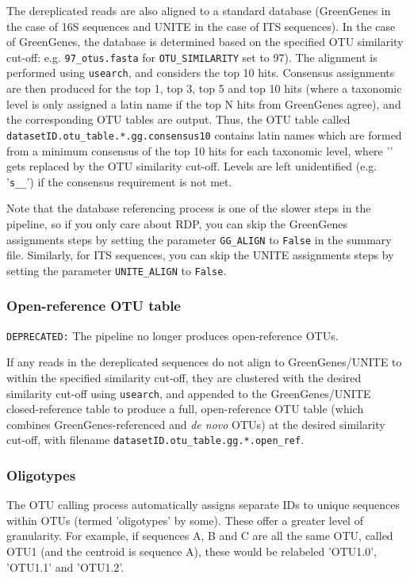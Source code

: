 \documentclass[11pt, oneside]{article}   	%
\begin{document}
The dereplicated reads are also aligned to a standard database (GreenGenes in the case of 16S sequences and UNITE in the case of ITS sequences).  In the case of GreenGenes, the database is determined based on the specified OTU similarity cut-off: e.g. {\tt 97\_otus.fasta} for {\tt OTU\_SIMILARITY} set to 97).  The alignment is performed using {\tt usearch}, and considers the top 10 hits.  Consensus assignments are then produced for the top 1, top 3, top 5 and top 10 hits (where a taxonomic level is only assigned a latin name if the top N hits from GreenGenes agree), and the corresponding OTU tables are output.  Thus, the OTU table called {\tt datasetID.otu\_table.*.gg.consensus10} contains latin names which are formed from a minimum consensus of the top 10 hits for each taxonomic level, where '{\tt *}' gets replaced by the OTU similarity cut-off.  Levels are left unidentified (e.g. '{\tt s\_\_}') if the consensus requirement is not met.  

Note that the database referencing process is one of the slower steps in the pipeline, so if you only care about RDP, you can skip the GreenGenes assignments steps by setting the parameter {\tt GG\_ALIGN} to {\tt False} in the summary file.  Similarly, for ITS sequences, you can skip the UNITE assignments steps by setting the parameter {\tt UNITE\_ALIGN} to {\tt False}.

\subsubsection{Open-reference OTU table}
{\tt DEPRECATED:} The pipeline no longer produces open-reference OTUs. 

If any reads in the dereplicated sequences do not align to GreenGenes/UNITE to within the specified similarity cut-off, they are clustered with the desired similarity cut-off using {\tt usearch}, and appended to the GreenGenes/UNITE closed-reference table to produce a full, open-reference OTU table (which combines GreenGenes-referenced and \textit{de novo} OTUs) at the desired similarity cut-off, with filename {\tt datasetID.otu\_table.gg.*.open\_ref}.

\subsubsection{Oligotypes}
The OTU calling process automatically assigns separate IDs to unique sequences within OTUs (termed 'oligotypes' by some).  These offer a greater level of granularity.  For example, if sequences A, B and C are all the same OTU, called OTU1 (and the centroid is sequence A), these would be relabeled 'OTU1.0', 'OTU1.1' and 'OTU1.2'.
\end{document}
